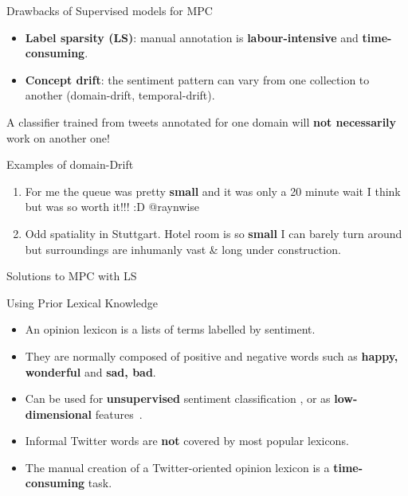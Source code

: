 \documentclass[handout]{beamer}
\begin{document}
\begin{frame}{Drawbacks of Supervised models for MPC}
\begin{scriptsize}
  \begin{itemize}
   \item \textbf{Label sparsity (LS)}: manual annotation is \textbf{labour-intensive} and \textbf{time-consuming}. 
   \item \textbf{Concept drift}: the sentiment pattern can vary from one collection to another (domain-drift, temporal-drift).
  \end{itemize} 

A classifier trained from tweets annotated for one domain will \textbf{not necessarily} work on another one!

\begin{block}{Examples of domain-Drift}
\begin{enumerate}
\item  For me the queue was pretty \textcolor[rgb]{0.00,0.00,1.00}{\textbf{small}} and it was only a 20 minute wait I think but was so worth it!!! :D @raynwise
\item Odd spatiality in Stuttgart. Hotel room is so  \textcolor[rgb]{1.00,0.00,0.00}{\textbf{small}} I can barely turn around but surroundings are inhumanly vast \& long under construction.
\end{enumerate}
\end{block}


\end{scriptsize}

\end{frame}




\begin{frame}{Solutions to MPC with LS}
\begin{scriptsize}
\begin{block}{Using Prior Lexical Knowledge}
  \begin{itemize}
  \item An opinion lexicon is a lists of terms labelled by sentiment.
\item They are normally composed of positive and negative words such as \textcolor[rgb]{0.00,0.00,1.00}{\textbf{happy, wonderful}} and \textcolor[rgb]{1.00,0.00,0.00}{\textbf{sad, bad}}.
\item Can be used for \textbf{unsupervised} sentiment classification \cite{ThelwallBP12}, or as \textbf{low-dimensional} features~\cite{kouloumpis2011twitter}.   
\item Informal Twitter words are \textbf{not} covered by most popular lexicons.
\item The manual creation of a Twitter-oriented opinion lexicon is a \textbf{time-consuming} task.
  \end{itemize} 
\end{block}

\end{scriptsize}

\end{frame}
\end{document}
